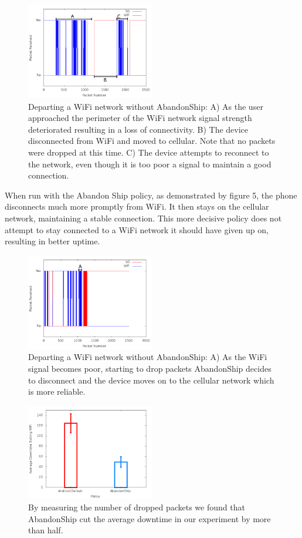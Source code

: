 \begin{figure}
	\includegraphics[width=0.5\textwidth]{leavingCourtyardsNoPolicy}
	\caption{Departing a WiFi network without AbandonShip: A) As the user approached the perimeter of the WiFi network signal strength deteriorated resulting in a loss of connectivity. B) The device disconnected from WiFi and moved to cellular. Note that no packets were dropped at this time. C) The device attempts to reconnect to the network, even though it is too poor a signal to maintain a good connection.}
\end{figure}

When run with the Abandon Ship policy, as demonstrated by figure 5, the phone disconnects much more promptly from WiFi. It then stays on the cellular network, maintaining a stable connection. This more decisive policy does not attempt to stay connected to a WiFi network it should have given up on, resulting in better uptime.

\begin{figure}
	\includegraphics[width=0.5\textwidth]{leavingCourtyardsWithPolicy}
	\caption{Departing a WiFi network without AbandonShip: A) As the WiFi signal becomes poor, starting to drop packets AbandonShip decides to disconnect and the device moves on to the cellular network which is more reliable.}
\end{figure}

\begin{figure}
	\includegraphics[width=0.5\textwidth]{bars}
	\caption{By measuring the number of dropped packets we found that AbandonShip cut the average downtime in our experiment by more than half.}
\end{figure}
